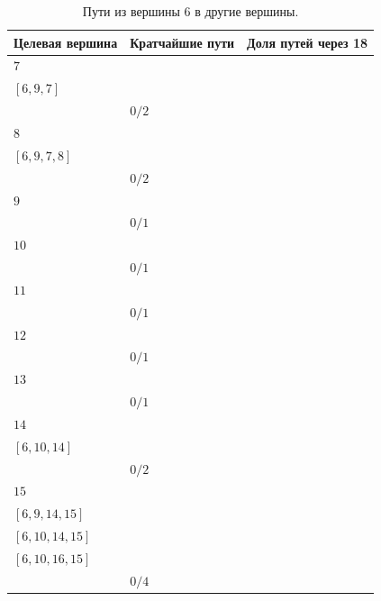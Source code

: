 \documentclass[12pt, a4paper]{extarticle}
\begin{document}
\begin{table}[h!]
    \caption{Пути из вершины $6$ в другие вершины.}
    \label{tbl:10-6}
    \begin{tabularx}{\textwidth}{|X|X|X|}
        \hline 
        Целевая вершина & Кратчайшие пути & Доля путей через 18 \\
        \hline 
        $7$ & \begin{tabular}{@{}l@{}} $[6, 3, 7]$ \\  $[6, 9, 7]$ \\ \end{tabular} & $0/2$ \\
        \hline
        $8$ & \begin{tabular}{@{}l@{}} $[6, 3, 7, 8]$ \\  $[6, 9, 7, 8]$ \\ \end{tabular} & $0/2$ \\
        \hline
        $9$ & \begin{tabular}{@{}l@{}} $[6, 9]$ \\ \end{tabular} & $0/1$ \\
        \hline
        $10$ & \begin{tabular}{@{}l@{}} $[6, 10]$ \\ \end{tabular} & $0/1$ \\
        \hline
        $11$ & \begin{tabular}{@{}l@{}} $[6, 10, 11]$ \\ \end{tabular} & $0/1$ \\
        \hline
        $12$ & \begin{tabular}{@{}l@{}} $[6, 9, 13, 12]$ \\ \end{tabular} & $0/1$ \\
        \hline
        $13$ & \begin{tabular}{@{}l@{}} $[6, 9, 13]$ \\ \end{tabular} & $0/1$ \\
        \hline
        $14$ & \begin{tabular}{@{}l@{}} $[6, 9, 14]$ \\  $[6, 10, 14]$ \\ \end{tabular} & $0/2$ \\
        \hline
        $15$ & \begin{tabular}{@{}l@{}} $[6, 9, 13, 15]$ \\  $[6, 9, 14, 15]$ \\  $[6, 10, 14, 15]$ \\  $[6, 10, 16, 15]$ \\ \end{tabular} & $0/4$ \\

\end{tabularx}
\end{table}
\end{document}
